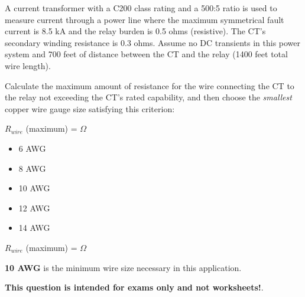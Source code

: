 

A current transformer with a C200 class rating and a 500:5 ratio is used to measure current through a power line where the maximum symmetrical fault current is 8.5 kA and the relay burden is 0.5 ohms (resistive).  The CT's secondary winding resistance is 0.3 ohms.  Assume no DC transients in this power system and 700 feet of distance between the CT and the relay (1400 feet total wire length).

\vskip 10pt

Calculate the maximum amount of resistance for the wire connecting the CT to the relay not exceeding the CT's rated capability, and then choose the {\it smallest} copper wire gauge size satisfying this criterion:

\vskip 10pt

$R_{wire}$ (maximum) = \underbar{\hskip 50pt} $\Omega$

\vskip 10pt

\begin{itemize}
\item{} 6 AWG
\item{} 8 AWG
\item{} 10 AWG
\item{} 12 AWG
\item{} 14 AWG
\end{itemize}







$R_{wire}$ (maximum) =  $\Omega$

\vskip 10pt

{\bf 10 AWG} is the minimum wire size necessary in this application.
 






{\bf This question is intended for exams only and not worksheets!}.



